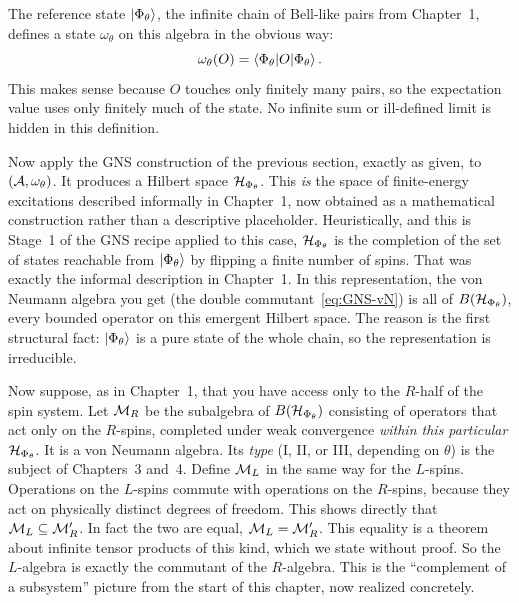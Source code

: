 The reference state $\ket{\Phi_\theta}$, the infinite chain of Bell-like pairs from Chapter~1, defines a state
$\omega_\theta$ on this algebra in the obvious way:
\[
\omega_\theta(O) = \braket{\Phi_\theta|O|\Phi_\theta} .
\]
This makes sense because $O$ touches only finitely many pairs, so the expectation value uses only finitely
much of the state. No infinite sum or ill-defined limit is hidden in this definition.

Now apply the GNS construction of the previous section, exactly as given, to $(\mathcal{A},\omega_\theta)$. It
produces a Hilbert space $\mathcal{H}_{\Phi_\theta}$. This \emph{is} the space of finite-energy excitations described
informally in Chapter~1, now obtained as a mathematical construction rather than a descriptive placeholder.
Heuristically, and this is Stage~1 of the GNS recipe applied to this case, $\mathcal{H}_{\Phi_\theta}$ is the completion
of the set of states reachable from $\ket{\Phi_\theta}$ by flipping a finite number of spins. That was
exactly the informal description in Chapter~1. In this representation, the von Neumann algebra you get
(the double commutant~\eqref{eq:GNS-vN}) is all of $B(\mathcal{H}_{\Phi_\theta})$, every bounded operator on this
emergent Hilbert space. The reason is the first structural fact: $\ket{\Phi_\theta}$ is a pure state of the
whole chain, so the representation is irreducible.

Now suppose, as in Chapter~1, that you have access only to the $R$-half of the spin system. Let $\mathcal{M}_R$ be the
subalgebra of $B(\mathcal{H}_{\Phi_\theta})$ consisting of operators that act only on the $R$-spins, completed under
weak convergence \emph{within this particular} $\mathcal{H}_{\Phi_\theta}$. It is a von Neumann algebra. Its
\emph{type} (I, II, or III, depending on $\theta$) is the subject of Chapters~3 and~4. Define $\mathcal{M}_L$ in the
same way for the $L$-spins. Operations on the $L$-spins commute with operations on the $R$-spins, because they
act on physically distinct degrees of freedom. This shows directly that $\mathcal{M}_L\subseteq\mathcal{M}_R'$. In fact the two
are equal, $\mathcal{M}_L=\mathcal{M}_R'$. This equality is a theorem about infinite tensor products of this kind, which we
state without proof. So the $L$-algebra is exactly the commutant of the $R$-algebra. This is the
``complement of a subsystem'' picture from the start of this chapter, now realized concretely.

